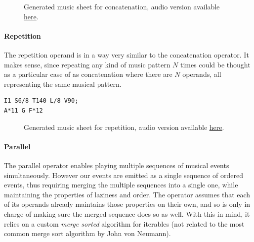 \documentclass[a4paper,UKenglish,cleveref, autoref]{oasics-v2019}
\begin{document}
\begin{figure}[ht]
  \centering
  {%
  \setlength{\fboxsep}{0pt}%
  \setlength{\fboxrule}{0pt}%
  }%
  \caption{Generated music sheet for concatenation\protect\footnotemark, audio version available \href{https://drive.google.com/open?id=1TP4lcul81s8iMCUFmD3HKnSpeftCzKT0}{\underline{here}}.}
  \label{fig:concatenation}
\end{figure}



\paragraph*{Repetition}
The repetition operand is in a way very similar to the concatenation operator. It makes sense, since repeating any kind of music pattern $N$ times could be thought as a particular case of as concatenation where there are $N$ operands, all representing the same musical pattern.

\begin{lstlisting}[caption={Intro to Westworld's Theme by Ramin Djawadi},label=list:5,captionpos=t,abovecaptionskip=-\medskipamount]
I1 S6/8 T140 L/8 V90;
A*11 G F*12
\end{lstlisting}

\begin{figure}[ht]
  \centering
  {%
  \setlength{\fboxsep}{0pt}%
  \setlength{\fboxrule}{0pt}%
  }%
  \caption{Generated music sheet for repetition, audio version available \href{https://drive.google.com/open?id=1IIm8PQkLsNFMK9MNSVubJSG6SP6KwhPL}{\underline{here}}.}
  \label{fig:repetition}
\end{figure}

\paragraph*{Parallel}
The parallel operator enables playing multiple sequences of musical events simultaneously. However our events are emitted as a single sequence of ordered events, thus requiring merging the multiple sequences into a single one, while maintaining the properties of laziness and order. The operator assumes that each of its operands already maintains those properties on their own, and so is only in charge of making sure the merged sequence does so as well. With this in mind, it relies on a custom \textit{merge sorted} algorithm for iterables (not related to the most common merge sort algorithm by John von Neumann).
\end{document}
